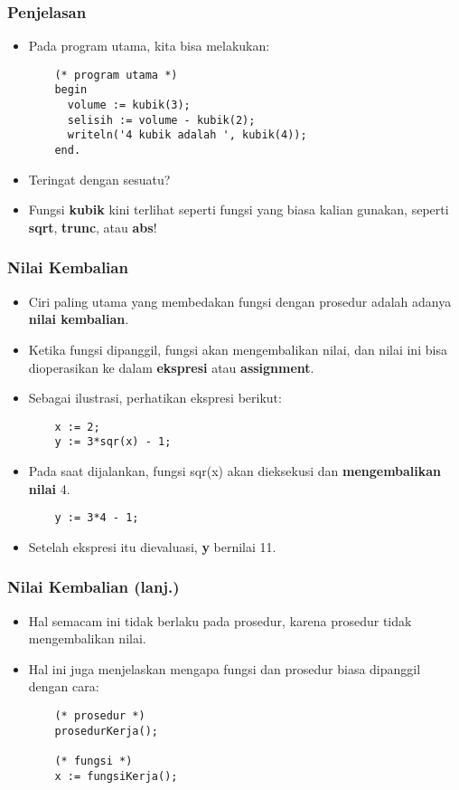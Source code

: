 \begin{frame}[fragile]
\frametitle{Penjelasan}
\begin{itemize}
  \item Pada program utama, kita bisa melakukan:
  \begin{lstlisting}
    (* program utama *)
    begin
      volume := kubik(3);
      selisih := volume - kubik(2);
      writeln('4 kubik adalah ', kubik(4));
    end.
  \end{lstlisting}
  \item Teringat dengan sesuatu?
  \item Fungsi \textbf{kubik} kini terlihat seperti fungsi yang biasa kalian gunakan, seperti \textbf{sqrt}, \textbf{trunc}, atau \textbf{abs}!
\end{itemize}
\end{frame}

\begin{frame}[fragile]
\frametitle{Nilai Kembalian}
\begin{itemize}
  \item Ciri paling utama yang membedakan fungsi dengan prosedur adalah adanya \textbf{nilai kembalian}.
  \item Ketika fungsi dipanggil, fungsi akan mengembalikan nilai, dan nilai ini bisa dioperasikan ke dalam \textbf{ekspresi} atau \textbf{assignment}.
  \item Sebagai ilustrasi, perhatikan ekspresi berikut:
  \begin{lstlisting}
    x := 2;
    y := 3*sqr(x) - 1;
  \end{lstlisting}
  \item Pada saat dijalankan, fungsi sqr(x) akan dieksekusi dan \textbf{mengembalikan nilai} 4.
  \begin{lstlisting}
    y := 3*4 - 1;
  \end{lstlisting}
  \item Setelah ekspresi itu dievaluasi, \textbf{y} bernilai 11.
\end{itemize}
\end{frame}

\begin{frame}[fragile]
\frametitle{Nilai Kembalian (lanj.)}
\begin{itemize}
  \item Hal semacam ini tidak berlaku pada prosedur, karena prosedur tidak mengembalikan nilai.
  \item Hal ini juga menjelaskan mengapa fungsi dan prosedur biasa dipanggil dengan cara:
  \begin{lstlisting}
    (* prosedur *)
    prosedurKerja();

    (* fungsi *)
    x := fungsiKerja();
  \end{lstlisting}
\end{itemize}
\end{frame}

